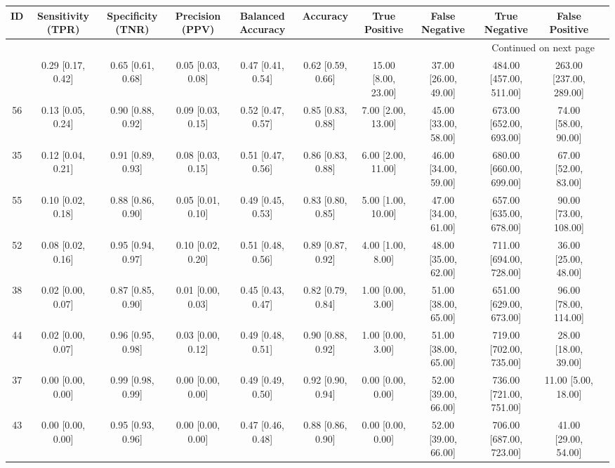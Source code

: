 \documentclass[8pt]{article}
\begin{document}
\begin{center}
\begin{footnotesize}
\begin{longtable}{|ccccccccccc|}
\toprule
 ID &  Sensitivity (TPR) &  Specificity (TNR) &    Precision (PPV) &  Balanced Accuracy &           Accuracy &        True Positive &        False Negative &            True Negative &           False Positive \\
\midrule
\endhead
\midrule
\multicolumn{10}{r}{{Continued on next page}} \\
\midrule
\endfoot

\bottomrule
\endlastfoot
 33 &  0.29 [0.17, 0.42] &  0.65 [0.61, 0.68] &  0.05 [0.03, 0.08] &  0.47 [0.41, 0.54] &  0.62 [0.59, 0.66] &  15.00 [8.00, 23.00] &  37.00 [26.00, 49.00] &  484.00 [457.00, 511.00] &  263.00 [237.00, 289.00] \\
 56 &  0.13 [0.05, 0.24] &  0.90 [0.88, 0.92] &  0.09 [0.03, 0.15] &  0.52 [0.47, 0.57] &  0.85 [0.83, 0.88] &   7.00 [2.00, 13.00] &  45.00 [33.00, 58.00] &  673.00 [652.00, 693.00] &     74.00 [58.00, 90.00] \\
 35 &  0.12 [0.04, 0.21] &  0.91 [0.89, 0.93] &  0.08 [0.03, 0.15] &  0.51 [0.47, 0.56] &  0.86 [0.83, 0.88] &   6.00 [2.00, 11.00] &  46.00 [34.00, 59.00] &  680.00 [660.00, 699.00] &     67.00 [52.00, 83.00] \\
 55 &  0.10 [0.02, 0.18] &  0.88 [0.86, 0.90] &  0.05 [0.01, 0.10] &  0.49 [0.45, 0.53] &  0.83 [0.80, 0.85] &   5.00 [1.00, 10.00] &  47.00 [34.00, 61.00] &  657.00 [635.00, 678.00] &    90.00 [73.00, 108.00] \\
 52 &  0.08 [0.02, 0.16] &  0.95 [0.94, 0.97] &  0.10 [0.02, 0.20] &  0.51 [0.48, 0.56] &  0.89 [0.87, 0.92] &    4.00 [1.00, 8.00] &  48.00 [35.00, 62.00] &  711.00 [694.00, 728.00] &     36.00 [25.00, 48.00] \\
 38 &  0.02 [0.00, 0.07] &  0.87 [0.85, 0.90] &  0.01 [0.00, 0.03] &  0.45 [0.43, 0.47] &  0.82 [0.79, 0.84] &    1.00 [0.00, 3.00] &  51.00 [38.00, 65.00] &  651.00 [629.00, 673.00] &    96.00 [78.00, 114.00] \\
 44 &  0.02 [0.00, 0.07] &  0.96 [0.95, 0.98] &  0.03 [0.00, 0.12] &  0.49 [0.48, 0.51] &  0.90 [0.88, 0.92] &    1.00 [0.00, 3.00] &  51.00 [38.00, 65.00] &  719.00 [702.00, 735.00] &     28.00 [18.00, 39.00] \\
 37 &  0.00 [0.00, 0.00] &  0.99 [0.98, 0.99] &  0.00 [0.00, 0.00] &  0.49 [0.49, 0.50] &  0.92 [0.90, 0.94] &    0.00 [0.00, 0.00] &  52.00 [39.00, 66.00] &  736.00 [721.00, 751.00] &      11.00 [5.00, 18.00] \\
 43 &  0.00 [0.00, 0.00] &  0.95 [0.93, 0.96] &  0.00 [0.00, 0.00] &  0.47 [0.46, 0.48] &  0.88 [0.86, 0.90] &    0.00 [0.00, 0.00] &  52.00 [39.00, 66.00] &  706.00 [687.00, 723.00] &     41.00 [29.00, 54.00] \\
\end{longtable}
\end{footnotesize}
\end{center}
\end{document}
